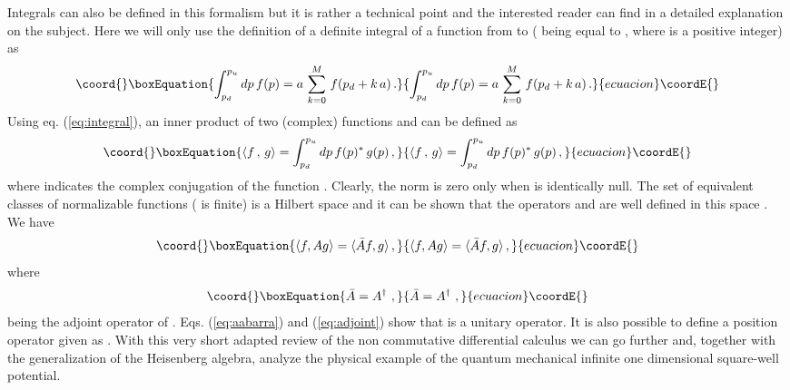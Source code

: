 \documentclass[a4paper,12pt]{article}
\begin{document}
Integrals can also be defined in this formalism but 
it is rather a technical point and the interested 
reader can find in \cite{dimakis1} a detailed 
explanation on the subject. Here we will 
only use the definition of a definite integral of a function 
\coordHE{} from \coordHE{} to \coordHE{} ( \coordHE{} being equal to 
\coordHE{}, 
where \coordHE{} is a positive integer) as 
\begin{equation}\coord{}\boxEquation{
    \int_{p_{d}}^{p_{u}} dp \, f(p) = a \, 
    \sum_{k=0}^{M} \, f(p_{d} + k \, a) \, .
    \label{eq:integral}
}{
    \int_{p_{d}}^{p_{u}} dp \, f(p) = a \, 
    \sum_{k=0}^{M} \, f(p_{d} + k \, a) \, .
    }{ecuacion}\coordE{}\end{equation} 
Using eq. (\ref{eq:integral}), 
an inner product of two (complex) functions 
\coordHE{} and \coordHE{} can be defined as 
\begin{equation}\coord{}\boxEquation{
    \langle f \, , \, g \rangle = \int_{p_{d}}^{p_{u}} dp \, f(p)^{*} \, g(p) \, , 
    \label{eq:inner}
}{
    \langle f \, , \, g \rangle = \int_{p_{d}}^{p_{u}} dp \, f(p)^{*} \, g(p) \, , 
    }{ecuacion}\coordE{}\end{equation}
where \myHighlight{$^{*}$}\coordHE{} indicates the complex conjugation of the function \coordHE{}.  Clearly, 
the norm \coordHE{} is
zero only when \coordHE{} is identically null.  The set of equivalent classes  
of normalizable functions \coordHE{} (\coordHE{} is finite) 
is a Hilbert space and it can be shown that   
the operators \coordHE{} and \coordHE{} are well defined in 
this space \cite{dimakis1}. We have
\begin{equation}\coord{}\boxEquation{
    \langle f, A g \rangle = \langle \bar{A} f, g \rangle \, ,
    \label{eq:inner2}
}{
    \langle f, A g \rangle = \langle \bar{A} f, g \rangle \, ,
    }{ecuacion}\coordE{}\end{equation}
where  
\begin{equation}\coord{}\boxEquation{
    \bar{A} = A^\dagger \, \, ,
    \label{eq:adjoint}
}{
    \bar{A} = A^\dagger \, \, ,
    }{ecuacion}\coordE{}\end{equation}
being \coordHE{} the adjoint operator of \coordHE{}.  Eqs. (\ref{eq:aabarra}) and 
(\ref{eq:adjoint}) show that \coordHE{} is a unitary operator. 
It is also possible to define a position operator \coordHE{} given as
\coordHE{} \cite{dimakis1}. 
With this very short 
adapted review of the non commutative differential calculus 
we can go further and, 
together with the generalization of the Heisenberg algebra, analyze the  
physical example of the 
quantum mechanical infinite one dimensional square-well potential. 
\end{document}

